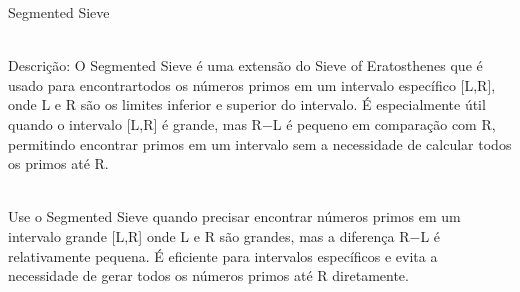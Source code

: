\documentclass{article}
\begin{document}
Segmented Sieve

\\Descrição: O Segmented Sieve é uma extensão do Sieve of Eratosthenes que é usado para encontrartodos os números primos em um intervalo específico [L,R], onde 
L e R são os limites inferior e superior do intervalo. É especialmente útil quando o intervalo 
[L,R] é grande, mas R−L é pequeno em comparação com R, permitindo encontrar primos em um intervalo sem a necessidade de calcular todos os primos até R.

\\Use o Segmented Sieve quando precisar encontrar números primos em um intervalo grande [L,R] onde 
L e R são grandes, mas a diferença R−L é relativamente pequena. É eficiente para intervalos específicos e evita a necessidade de gerar todos os números primos até R diretamente.
\end{document}
